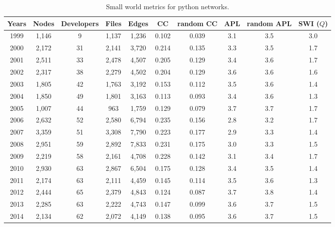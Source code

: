 \begin{table}[H]
\begin{center}
\begin{tabular}{|c|c|c|c|c|c|c|c|c|c|}
\hline
Years&Nodes&Developers&Files&Edges&CC&random CC&APL&random APL&SWI ($Q$)\\
\hline
1999&1,146&9&1,137&1,236&0.102&0.039&3.1&3.5&3.0\\
2000&2,172&31&2,141&3,720&0.214&0.135&3.3&3.5&1.7\\
2001&2,511&33&2,478&4,507&0.205&0.129&3.4&3.6&1.7\\
2002&2,317&38&2,279&4,502&0.204&0.129&3.6&3.6&1.6\\
2003&1,805&42&1,763&3,192&0.153&0.112&3.5&3.6&1.4\\
2004&1,850&49&1,801&3,163&0.113&0.093&3.4&3.6&1.3\\
2005&1,007&44&963&1,759&0.129&0.079&3.7&3.7&1.7\\
2006&2,632&52&2,580&6,794&0.235&0.156&2.8&3.2&1.7\\
2007&3,359&51&3,308&7,790&0.223&0.177&2.9&3.3&1.4\\
2008&2,951&59&2,892&7,833&0.231&0.175&3.0&3.3&1.5\\
2009&2,219&58&2,161&4,708&0.228&0.142&3.1&3.4&1.7\\
2010&2,930&63&2,867&6,504&0.175&0.128&3.4&3.5&1.4\\
2011&2,174&63&2,111&4,459&0.145&0.114&3.5&3.6&1.3\\
2012&2,444&65&2,379&4,843&0.124&0.087&3.7&3.8&1.4\\
2013&2,285&63&2,222&4,743&0.147&0.099&3.6&3.7&1.5\\
2014&2,134&62&2,072&4,149&0.138&0.095&3.6&3.7&1.5\\
\hline
\end{tabular}
\caption{Small world metrics for python networks.}
\label{swi_python}
\end{center}
\end{table}

